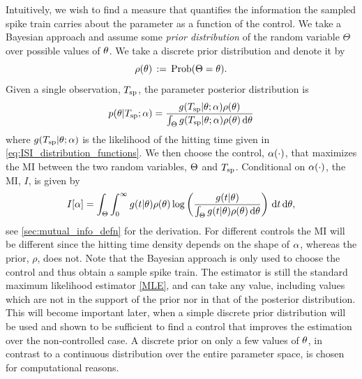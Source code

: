 \documentclass[12pt]{article}
\begin{document}

Intuitively, we wish to find a measure that quantifies the information
the sampled spike train carries about the parameter as a function of
the control. We take a Bayesian approach and assume some {\sl  prior
  distribution} of the random variable $\Theta$ over
possible values of ${\theta}$. We take a discrete prior distribution
and denote it by
$$
\rho({\theta}) \, := \,  \operatorname{Prob}(\Theta = {\theta})  . 
$$
Given a single observation, ${ T_{\textrm{sp} } }$, the parameter posterior 
distribution is 
\begin{equation}
p({\theta}| { T_{\textrm{sp} } }; {\alpha}) =
\frac{g({ T_{\textrm{sp} } } |{\theta}; {\alpha}) \rho({\theta})}{\int_\Theta g({ T_{\textrm{sp} } }|{\theta}; {\alpha}) \rho({\theta})
\, \mathrm{d} {\theta}}
\label{eq:parameter_posterior_defn}
\end{equation} 
where $ g( { T_{\textrm{sp} } } |{\theta}; {\alpha})$ is the likelihood of the hitting time given in
\cref{eq:ISI_distribution_functions}. We then choose the control,
${\alpha}(\cdot)$, that maximizes the MI  between the two random variables, ${\Theta}$ and ${ T_{\textrm{sp} } }$. Conditional on
${\alpha}(\cdot)$, the MI, $I$, is given by
\begin{equation}
I[{\alpha}]= 
\int_\Theta \int_0^\infty g(t|{\theta})\rho({\theta})  
\log \left( \frac{g(t|{\theta})}
{\int_\Theta g(t|{\theta})\rho({\theta}) \, \mathrm{d} {\theta}   } \right)
\, \mathrm{d} t\, \mathrm{d} {\theta},
\label{eq:J_mutual_info_objective}
\end{equation}
see \cref{sec:mutual_info_defn} for the derivation. For different controls
the MI will be different since the hitting time
density depends on the shape of ${\alpha}$, whereas the prior, $\rho$, does
not. Note that the Bayesian approach is only used to choose the
control and thus obtain a sample spike train. The estimator is still the
standard maximum likelihood estimator \cref{MLE}, and can take any
value, including values which are not in the support of the prior nor in that of the
posterior distribution. This will become 
important later, when a simple discrete prior distribution will be
used and shown to be sufficient to find a control that improves
the estimation over the non-controlled case. A discrete prior on
only a few values of ${\theta}$, in contrast to a continuous distribution
over the entire parameter space, is chosen for computational reasons. 
  
\end{document}
